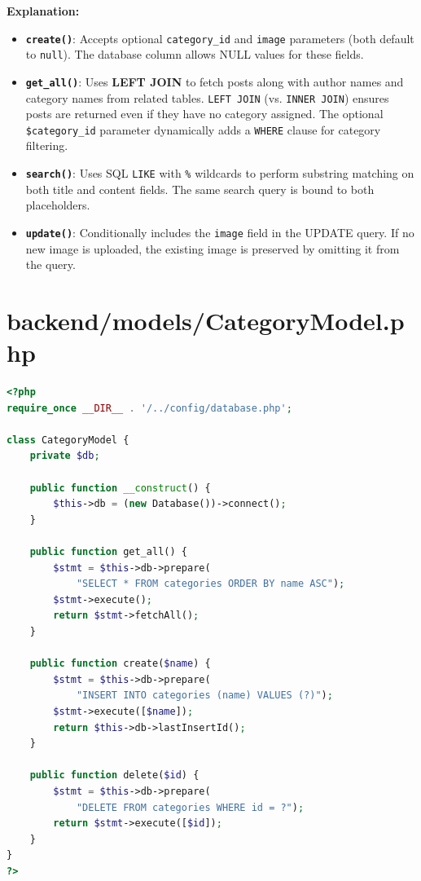 \documentclass[12pt,a4paper]{report}
\begin{document}
\textbf{Explanation:}
\begin{itemize}
    \item \textbf{\texttt{create()}}: Accepts optional \texttt{category\_id} and \texttt{image} parameters (both default to \texttt{null}). The database column allows NULL values for these fields.
    \item \textbf{\texttt{get\_all()}}: Uses \textbf{LEFT JOIN} to fetch posts along with author names and category names from related tables. \texttt{LEFT JOIN} (vs. \texttt{INNER JOIN}) ensures posts are returned even if they have no category assigned. The optional \texttt{\$category\_id} parameter dynamically adds a \texttt{WHERE} clause for category filtering.
    \item \textbf{\texttt{search()}}: Uses SQL \texttt{LIKE} with \texttt{\%} wildcards to perform substring matching on both title and content fields. The same search query is bound to both placeholders.
    \item \textbf{\texttt{update()}}: Conditionally includes the \texttt{image} field in the UPDATE query. If no new image is uploaded, the existing image is preserved by omitting it from the query.
\end{itemize}

\section{backend/models/CategoryModel.php}

\begin{lstlisting}[language=PHP]
<?php
require_once __DIR__ . '/../config/database.php';

class CategoryModel {
    private $db;

    public function __construct() {
        $this->db = (new Database())->connect();
    }

    public function get_all() {
        $stmt = $this->db->prepare(
            "SELECT * FROM categories ORDER BY name ASC");
        $stmt->execute();
        return $stmt->fetchAll();
    }

    public function create($name) {
        $stmt = $this->db->prepare(
            "INSERT INTO categories (name) VALUES (?)");
        $stmt->execute([$name]);
        return $this->db->lastInsertId();
    }

    public function delete($id) {
        $stmt = $this->db->prepare(
            "DELETE FROM categories WHERE id = ?");
        return $stmt->execute([$id]);
    }
}
?>
\end{lstlisting}
\end{document}

